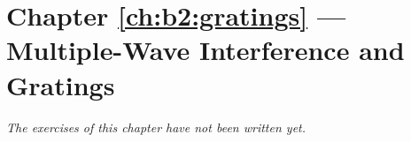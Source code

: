 \section*{Chapter \ref{ch:b2:gratings} --- Multiple-Wave Interference and Gratings}


\emph{The exercises of this chapter have not been written yet.}
